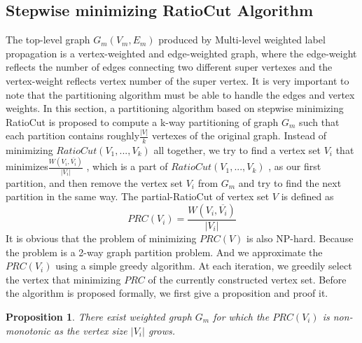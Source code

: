 \documentclass{acm_proc_article-sp}
\begin{document}
\subsection{Stepwise minimizing RatioCut Algorithm}
The top-level graph $G_{m}(V_{m},E_{m})$ produced by Multi-level weighted label propagation is a vertex-weighted and edge-weighted graph, where the edge-weight reflects the number of edges connecting two different super vertexes and the vertex-weight reflects vertex number of the super vertex. It is very important to note that the partitioning algorithm must be able to handle the edges and vertex weights. In this section, a partitioning algorithm based on stepwise minimizing RatioCut is proposed to compute a k-way partitioning of graph $G_{m}$ such that each partition contains roughly$\frac{|V|}{k}$ vertexes of the original graph. Instead of minimizing $RatioCut(V_{1},...,V_{k} )$ all together, we try to find a vertex set $V_{i}$ that minimizes$\frac{W(V_{i},\overline{V_{i}})}{|V_{i}|}$ , which is a part of $RatioCut(V_{1},...,V_{k})$ , as our first partition, and then remove the vertex set $V_{i}$ from $G_{m}$ and try to find the next partition in the same way. The partial-RatioCut of vertex set $V$ is defined as
\begin{displaymath}
PRC(V_{i})=\frac{W(V_{i},\overline{V_{i}})}{|V_{i}|}
\end{displaymath}
It is obvious that the problem of minimizing $PRC(V)$ is also NP-hard. Because the problem is a 2-way graph partition problem. And we approximate the $PRC(V_{i})$ using a simple greedy algorithm. At each iteration, we greedily select the vertex that minimizing $PRC$ of the currently constructed vertex set. Before the algorithm is proposed formally, we first give a proposition and proof it.
\newtheorem{proposition}{Proposition}
\begin{proposition}
\label{pro:mono}
There exist weighted graph $G_{m}$ for which the $PRC(V_{i})$ is non-monotonic as the vertex size $|V_{i}|$ grows.
\end{proposition}
\end{document}
